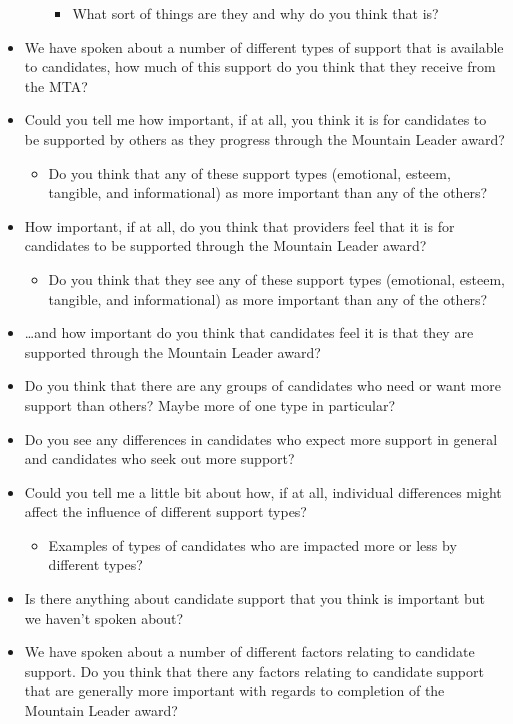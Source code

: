 \documentclass[
  12pt,
  a4paper,
]{book}
\providecommand{\tightlist}{%
  \setlength{\itemsep}{0pt}\setlength{\parskip}{0pt}}
\begin{document}
\begin{itemize}
\begin{itemize}
    \begin{itemize}
    \tightlist
    \item
      What sort of things are they and why do you think that is?
    \end{itemize}
  \end{itemize}
\item
  We have spoken about a number of different types of support that is available to candidates, how much of this support do you think that they receive from the MTA?
\item
  Could you tell me how important, if at all, you think it is for candidates to be supported by others as they progress through the Mountain Leader award?

  \begin{itemize}
  \tightlist
  \item
    Do you think that any of these support types (emotional, esteem, tangible, and informational) as more important than any of the others?
  \end{itemize}
\item
  How important, if at all, do you think that providers feel that it is for candidates to be supported through the Mountain Leader award?

  \begin{itemize}
  \tightlist
  \item
    Do you think that they see any of these support types (emotional, esteem, tangible, and informational) as more important than any of the others?
  \end{itemize}
\item
  \ldots and how important do you think that candidates feel it is that they are supported through the Mountain Leader award?
\item
  Do you think that there are any groups of candidates who need or want more support than others? Maybe more of one type in particular?
\item
  Do you see any differences in candidates who expect more support in general and candidates who seek out more support?
\item
  Could you tell me a little bit about how, if at all, individual differences might affect the influence of different support types?

  \begin{itemize}
  \tightlist
  \item
    Examples of types of candidates who are impacted more or less by different types?
  \end{itemize}
\item
  Is there anything about candidate support that you think is important but we haven't spoken about?
\item
  We have spoken about a number of different factors relating to candidate support. Do you think that there any factors relating to candidate support that are generally more important with regards to completion of the Mountain Leader award?
\end{itemize}
\end{document}
